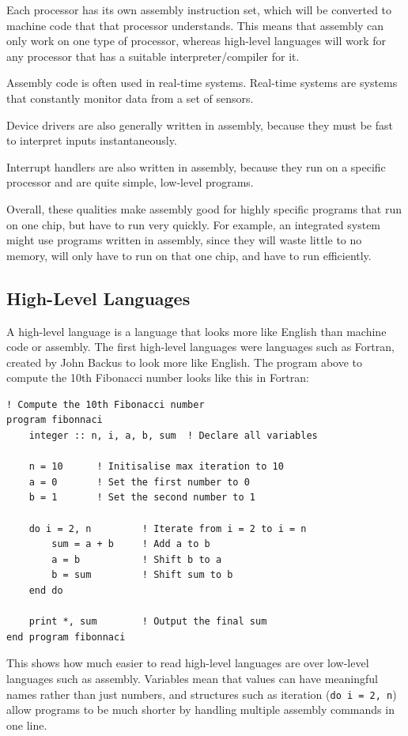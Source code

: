         Each processor has its own assembly instruction set, which will be converted to machine code that that processor understands.
        This means that assembly can only work on one type of processor, whereas high-level languages will work for any processor that has a suitable interpreter/compiler for it.

        Assembly code is often used in real-time systems.
        Real-time systems are systems that constantly monitor data from a set of sensors.

        Device drivers are also generally written in assembly, because they must be fast to interpret inputs instantaneously.

        Interrupt handlers are also written in assembly, because they run on a specific processor and are quite simple, low-level programs.

        Overall, these qualities make assembly good for highly specific programs that run on one chip, but have to run very quickly.
        For example, an integrated system might use programs written in assembly, since they will waste little to no memory, will only have to run on that one chip, and have to run efficiently.

    \subsection{High-Level Languages}
        A high-level language is a language that looks more like English than machine code or assembly.
        The first high-level languages were languages such as Fortran, created by John Backus to look more like English.
        The program above to compute the 10th Fibonacci number looks like this in Fortran:
        \begin{verbatim}
! Compute the 10th Fibonacci number
program fibonnaci
    integer :: n, i, a, b, sum  ! Declare all variables

    n = 10      ! Initisalise max iteration to 10
    a = 0       ! Set the first number to 0
    b = 1       ! Set the second number to 1

    do i = 2, n         ! Iterate from i = 2 to i = n
        sum = a + b     ! Add a to b
        a = b           ! Shift b to a
        b = sum         ! Shift sum to b
    end do

    print *, sum        ! Output the final sum
end program fibonnaci
        \end{verbatim}
        This shows how much easier to read high-level languages are over low-level languages such as assembly.
        Variables mean that values can have meaningful names rather than just numbers, and structures such as iteration (\verb|do i = 2, n|) allow programs to be much shorter by handling multiple assembly commands in one line.

